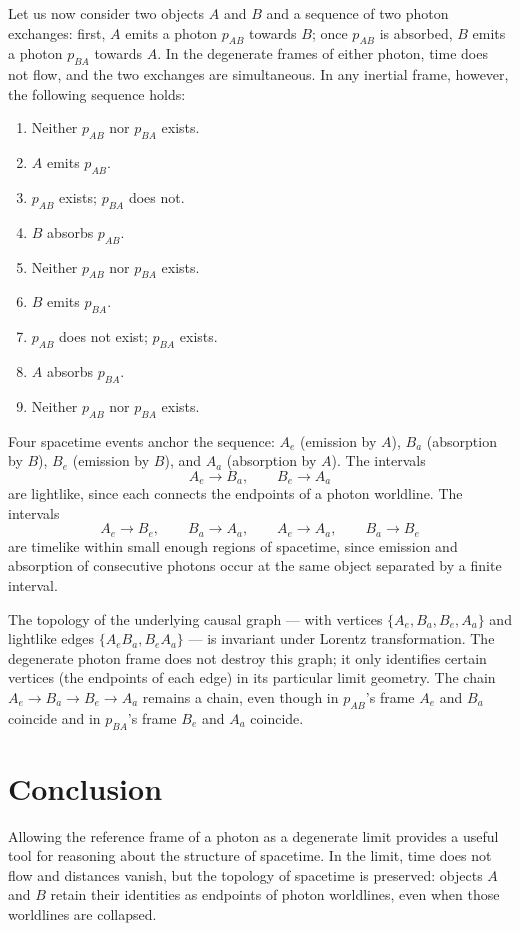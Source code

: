 \documentclass[11pt]{article}
\begin{document}
Let us now consider two objects $A$ and $B$ and a sequence of two photon exchanges: first, $A$ emits a photon $p_{AB}$ towards $B$; once $p_{AB}$ is absorbed, $B$ emits a photon $p_{BA}$ towards $A$. In the degenerate frames of either photon, time does not flow, and the two exchanges are simultaneous. In any inertial frame, however, the following sequence holds:
\begin{enumerate}
\item Neither $p_{AB}$ nor $p_{BA}$ exists.
\item $A$ emits $p_{AB}$.
\item $p_{AB}$ exists; $p_{BA}$ does not.
\item $B$ absorbs $p_{AB}$.
\item Neither $p_{AB}$ nor $p_{BA}$ exists.
\item $B$ emits $p_{BA}$.
\item $p_{AB}$ does not exist; $p_{BA}$ exists.
\item $A$ absorbs $p_{BA}$.
\item Neither $p_{AB}$ nor $p_{BA}$ exists.
\end{enumerate}

Four spacetime events anchor the sequence: $A_e$ (emission by $A$), $B_a$ (absorption by $B$), $B_e$ (emission by $B$), and $A_a$ (absorption by $A$). The intervals
\[
A_e \to B_a, \qquad B_e \to A_a
\]
are lightlike, since each connects the endpoints of a photon worldline. The intervals
\[
A_e \to B_e, \qquad B_a \to A_a, \qquad A_e \to A_a, \qquad B_a \to B_e
\]
are timelike within small enough regions of spacetime, since emission and absorption of consecutive photons occur at the same object separated by a finite interval.

The topology of the underlying causal graph --- with vertices $\{A_e, B_a, B_e, A_a\}$ and lightlike edges $\{A_eB_a, B_eA_a\}$ --- is invariant under Lorentz transformation. The degenerate photon frame does not destroy this graph; it only identifies certain vertices (the endpoints of each edge) in its particular limit geometry. The chain $A_e \to B_a \to B_e \to A_a$ remains a chain, even though in $p_{AB}$'s frame $A_e$ and $B_a$ coincide and in $p_{BA}$'s frame $B_e$ and $A_a$ coincide.

\section{Conclusion}

Allowing the reference frame of a photon as a degenerate limit provides a useful tool for reasoning about the structure of spacetime. In the limit, time does not flow and distances vanish, but the topology of spacetime is preserved: objects $A$ and $B$ retain their identities as endpoints of photon worldlines, even when those worldlines are collapsed.
\end{document}
